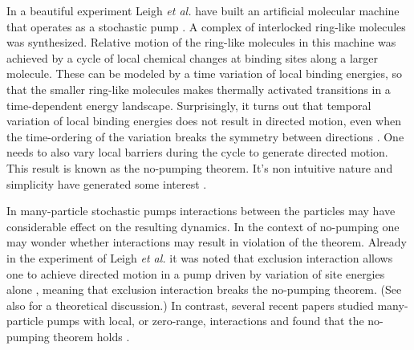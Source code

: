 \documentclass[aps,pre,showpacs,amsmath,amssymb,amsfonts,superscriptaddress,onecolumn,longbibliography]{revtex4-1}
\begin{document}
In a beautiful experiment Leigh {\it et al.} have built an
artificial molecular machine that operates as a stochastic pump \cite{leigh_unidirectional_2003}. A complex of interlocked ring-like molecules was synthesized.
Relative motion of the ring-like molecules in this machine was achieved
by a cycle of local chemical changes at binding sites along a larger molecule. These can be modeled
by a time variation of local binding energies, so that the smaller ring-like molecules
makes thermally activated transitions in a time-dependent energy landscape. Surprisingly, it turns out
that temporal variation of local binding energies does not result in directed motion, even when the time-ordering of
the variation breaks the symmetry between directions \cite{rahav_directed_2008,chernyak_pumping_2008}.
One needs to also vary local barriers during the cycle to generate directed motion.
This result is known as the no-pumping theorem. It's non intuitive nature and simplicity have generated
some interest  \citep{horowitz_exact_2009,mandal_hybrid_2012,maes_general_2010,mandal_proof_2011,ren_duality_2011}.

In many-particle stochastic pumps interactions between the particles may have considerable
effect on the resulting dynamics. In the context of no-pumping one may wonder whether interactions may result
in violation of the theorem. Already in the experiment of Leigh {\it et al.} it was noted
that exclusion interaction allows one to achieve directed motion in a pump driven by
variation of site energies alone \cite{leigh_unidirectional_2003}, meaning that
exclusion interaction breaks the no-pumping theorem.
(See also \cite{astumian_adiabatic_2003} for a theoretical discussion.) In contrast,
several recent papers studied many-particle pumps with local, or zero-range, interactions and
found that the no-pumping theorem holds \cite{asban_no-pumping_2014,mandal_unification_2014,Asban2015}.
\end{document}
